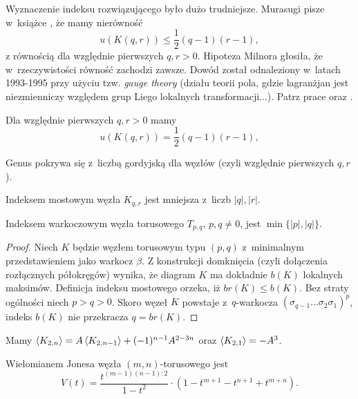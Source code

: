 Wyznaczenie indeksu rozwiązującego było dużo trudniejsze.
Murasugi pisze w~książce \cite{murasugi96}, że mamy nierówność
\[
    u(K(q, r)) \le \frac 12 (q-1)(r-1),
\]
z równością dla względnie pierwszych $q, r > 0$.
Hipoteza Milnora głosiła, że w~rzeczywistości równość zachodzi zawsze.
Dowód został odnaleziony w~latach 1993-1995 przy użyciu tzw. \emph{gauge theory} (działu teorii pola, gdzie lagranżjan jest niezmienniczy względem grup Liego lokalnych transformacji...).
Patrz prace \cite{kronheimer93} oraz \cite{kronheimer95}.

\begin{proposition} \label{torus_unknotting}
    Dla względnie pierwszych $q, r > 0$ mamy
    \[
        u(K(q, r)) = \frac 12 (q-1)(r-1),
    \]
\end{proposition}

Genus pokrywa się z~liczbą gordyjską dla węzłów (czyli względnie pierwszych $q, r$).

\begin{proposition} \label{torus_bridge}
    Indeksem mostowym węzła $K_{q,r}$ jest mniejsza z~liczb $|q|, |r|$.
\end{proposition}

\begin{corollary}
    \label{braid-for-forus}
    Indeksem warkoczowym węzła torusowego $T_{p, q}$, $p, q \neq 0$, jest $\min\{|p|, |q|\}$.
\end{corollary}

\begin{proof}
    Niech $K$ będzie węzłem torusowym typu $(p,q)$ z~minimalnym przedstawieniem jako warkocz $\beta$.
    Z konstrukcji domknięcia (czyli dołączenia rozłącznych półokręgów) wynika,
    że diagram $K$ ma dokładnie $b(K)$ lokalnych maksimów.
    Definicja indeksu mostowego orzeka, iż $br(K) \le b(K)$.
    Bez straty ogólności niech $p > q > 0$.
    Skoro węzeł $K$ powstaje z~$q$-warkocza $(\sigma_{q-1} \ldots \sigma_2\sigma_1)^p$,
    indeks $b(K)$ nie przekracza $q = br(K)$.
\end{proof}

\begin{proposition}
    Mamy $\left\langle{K_{2, n}}\right\rangle = A \left\langle{K_{2,n-1}}\right\rangle + (-1)^{n-1} A^{2-3n}$
    oraz $\left\langle{K_{2,1}}\right\rangle = -A^3$.
\end{proposition}

\begin{proposition}
    Wielomianem Jonesa węzła $(m, n)$-torusowego jest
    \[
        V(t) = \frac {t^{(m-1)(n-1):2}}{1-t^2} \cdot (1 - t^{m+1} - t^{n+1} + t^{m+n}).
    \]
\end{proposition}

